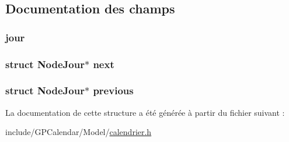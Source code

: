 \subsection{Documentation des champs}
\hypertarget{struct_node_jour_a6b700af15ea48800affa955a00734b02}{
\subsubsection[{jour}]{ jour}}\label{struct_node_jour_a6b700af15ea48800affa955a00734b02}
\hypertarget{struct_node_jour_a4d4c1312d6c41b196a1eca69e533f9b3}{
\subsubsection[{next}]{\setlength{\rightskip}{0pt plus 5cm}struct {\bf Node\-Jour}$\ast$ next}}\label{struct_node_jour_a4d4c1312d6c41b196a1eca69e533f9b3}
\hypertarget{struct_node_jour_acaf7d4f45774acfb09a39e336ebd1af7}{
\subsubsection[{previous}]{\setlength{\rightskip}{0pt plus 5cm}struct {\bf Node\-Jour}$\ast$ previous}}\label{struct_node_jour_acaf7d4f45774acfb09a39e336ebd1af7}


La documentation de cette structure a été générée à partir du fichier suivant \-:\begin{DoxyCompactItemize}
\item 
include/\-G\-P\-Calendar/\-Model/\hyperlink{calendrier_8h}{calendrier.\-h}\end{DoxyCompactItemize}
